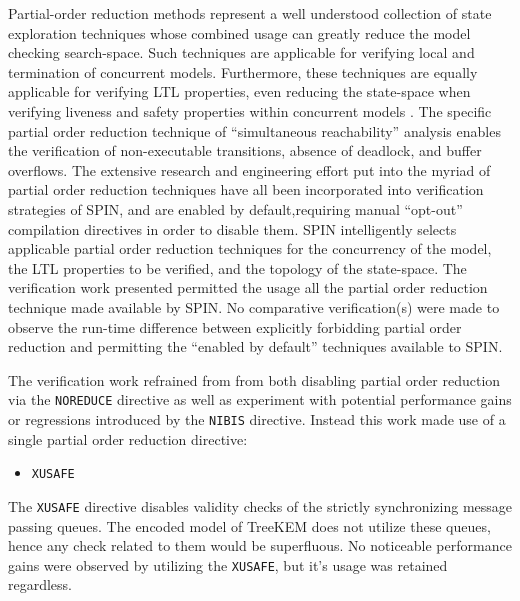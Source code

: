 Partial-order reduction methods represent a well understood collection of state exploration techniques \autocite{godefroid1990using, godefroid1991using, godefroid1994partial, holzmann1995improvement, katz1992verification, peled1993all, valmari1989stubborn, valmari1992stubborn} whose combined usage can greatly reduce the model checking search-space.
Such techniques are applicable for verifying local and termination of concurrent models.
Furthermore, these techniques are equally applicable for verifying LTL properties, even reducing the state-space when verifying liveness and safety properties within concurrent models \autocite{wolper1983reasoning}.
The specific partial order reduction technique of ``simultaneous reachability'' analysis \autocite{van1997partial} enables the verification of non-executable transitions, absence of deadlock, and buffer overflows.
The extensive research and engineering effort put into the myriad of partial order reduction techniques have all been incorporated into verification strategies of SPIN, and are enabled by default,requiring manual ``opt-out'' compilation directives in order to disable them.
SPIN intelligently selects applicable partial order reduction techniques for the concurrency of the model, the LTL properties to be verified, and the topology of the state-space.
The verification work presented permitted the usage all the partial order reduction technique made available by SPIN.\@
No comparative verification(s) were made to observe the run-time difference between explicitly forbidding partial order reduction and permitting the ``enabled by default'' techniques available to SPIN.\@

The verification work refrained from from both disabling partial order reduction via the \texttt{NOREDUCE} directive as well as experiment with potential performance gains or regressions introduced by the \texttt{NIBIS} directive.
Instead this work made use of a single partial order reduction directive:

\begin{itemize}
\item \texttt{XUSAFE}
\end{itemize}

The \texttt{XUSAFE} directive disables validity checks of the strictly synchronizing message passing queues.
The encoded model of TreeKEM does not utilize these queues, hence any check related to them would be superfluous.
No noticeable performance gains were observed by utilizing the \texttt{XUSAFE}, but it's usage was retained regardless.


